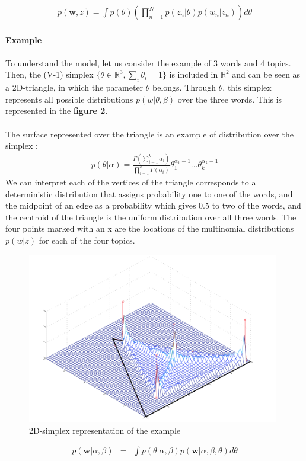 \documentclass[12pt]{article}
\begin{document}
\begin{eqnarray*}
p(\textbf{w},z)=\int p(\theta)(\prod_{n=1}^{N}p(z_{n} | \theta)p(w_{n}|z_{n}))d\theta
\end{eqnarray*}
~\\
\textbf{Example}~\\
~\\
To understand the model, let us consider the example of 3 words and 4 topics.
Then, the (V-1) simplex $\{\theta \in \mathbb{R}^{3}, \sum_{i}\theta_{i}=1\}$  is included in $\mathbb{R}^{2}$ and can be seen as a 2D-triangle, in which the parameter $\theta$ belongs. Through $\theta$, this simplex represents all possible distributions $p(w|\theta,\beta)$ over the three words. This is represented in the \textbf{figure 2}.~\\
~\\
The surface represented over the triangle is an example of distribution over the simplex :
\begin{eqnarray*}
p(\theta | \alpha)=\frac{\Gamma(\sum_{i=1}^{k}\alpha_{i})}{\prod_{i=1}^{k}\Gamma(\alpha_{i})}\theta_{1}^{\alpha_{1}-1}...\theta_{k}^{\alpha_{k}-1}
\end{eqnarray*}
We can interpret each of the vertices of the triangle corresponds to a deterministic distribution that assigns probability one to one of the words, and the midpoint of an edge as a probability which gives 0.5 to two of the words, and the centroid of the triangle is the uniform distribution over all three words. The four points marked with an x are the locations of the multinomial distributions $p(w | z)$ for each of the four topics.
\begin{figure}[!h]
\centering
\includegraphics[width=11cm]{Simplex}
\caption{2D-simplex representation of the example}
\end{figure}
\begin{eqnarray*}
p(\textbf{w}|\alpha, \beta) &  = & \int p(\theta | \alpha, \beta)p(\textbf{w} | \alpha, \beta, \theta)d\theta\\
\end{eqnarray*}
\end{document}

